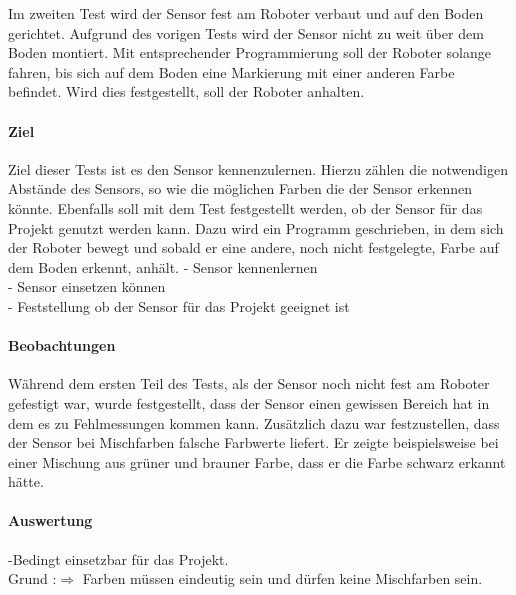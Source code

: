 Im zweiten Test wird der Sensor fest am Roboter verbaut und auf den Boden gerichtet. Aufgrund des vorigen Tests wird der Sensor nicht zu weit über dem Boden montiert. Mit entsprechender Programmierung soll der Roboter solange fahren, bis sich auf dem Boden eine Markierung mit einer anderen Farbe befindet. Wird dies festgestellt, soll der Roboter anhalten.  
\paragraph{Ziel}
Ziel dieser Tests ist es den Sensor kennenzulernen. Hierzu zählen die notwendigen Abstände des Sensors, so wie die möglichen Farben die der Sensor erkennen könnte.
Ebenfalls soll mit dem Test festgestellt werden, ob der Sensor für das Projekt genutzt werden kann. Dazu wird ein Programm geschrieben, in dem sich der Roboter bewegt und sobald er eine andere, noch nicht festgelegte, Farbe auf dem Boden erkennt, anhält. 
- Sensor kennenlernen\\
- Sensor einsetzen können\\
- Feststellung ob der Sensor für das Projekt geeignet ist

\paragraph{Beobachtungen}
Während dem ersten Teil des Tests, als der Sensor noch nicht fest am Roboter gefestigt war, wurde festgestellt, dass der Sensor einen gewissen Bereich hat in dem es zu Fehlmessungen kommen kann. Zusätzlich dazu war festzustellen, dass der Sensor bei Mischfarben falsche Farbwerte liefert. Er zeigte beispielsweise bei einer Mischung aus grüner und brauner Farbe, dass er die Farbe schwarz erkannt hätte.
\paragraph{Auswertung}
-Bedingt einsetzbar für das Projekt.\\
Grund :$\Rightarrow$ Farben müssen eindeutig sein und dürfen keine Mischfarben sein.